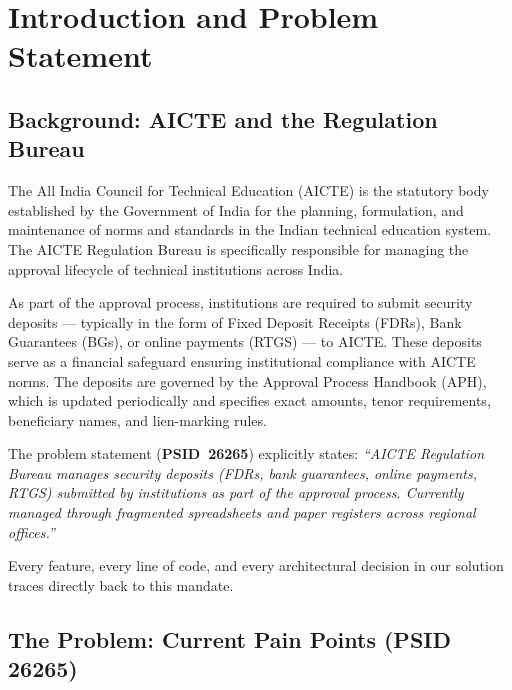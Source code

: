 \documentclass[12pt, a4paper]{report}
\newcommand{\psid}{\textbf{PSID~26265}}
\begin{document}
\tableofcontents
\newpage
\listoffigures
\listoftables
\newpage

\chapter{Introduction and Problem Statement}

\section{Background: AICTE and the Regulation Bureau}

The All India Council for Technical Education (AICTE) is the statutory body established by the Government of India for the planning, formulation, and maintenance of norms and standards in the Indian technical education system. The AICTE Regulation Bureau is specifically responsible for managing the approval lifecycle of technical institutions across India.

As part of the approval process, institutions are required to submit security deposits --- typically in the form of Fixed Deposit Receipts (FDRs), Bank Guarantees (BGs), or online payments (RTGS) --- to AICTE. These deposits serve as a financial safeguard ensuring institutional compliance with AICTE norms. The deposits are governed by the Approval Process Handbook (APH), which is updated periodically and specifies exact amounts, tenor requirements, beneficiary names, and lien-marking rules.

\begin{connectionbox}
The problem statement (\psid) explicitly states: \textit{``AICTE Regulation Bureau manages security deposits (FDRs, bank guarantees, online payments, RTGS) submitted by institutions as part of the approval process. Currently managed through fragmented spreadsheets and paper registers across regional offices.''}

Every feature, every line of code, and every architectural decision in our solution traces directly back to this mandate.
\end{connectionbox}

\section{The Problem: Current Pain Points (PSID 26265)}
\end{document}
